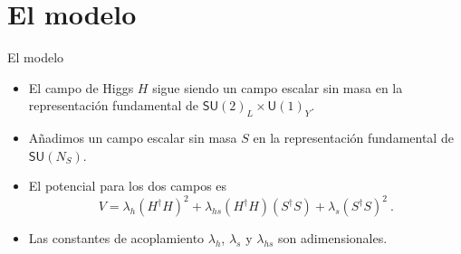 \documentclass{beamer}
\begin{document}
\section{El modelo}
\begin{frame}{El modelo}
\begin{itemize}
\item<only@1> El campo de Higgs $H$ sigue siendo un campo escalar sin masa en la representación fundamental de $\mathsf{SU}(2)_L\times \mathsf{U}(1)_Y$.
\item<only@1> Añadimos un campo escalar sin masa $S$ en la representación fundamental de $\mathsf{SU}(N_S)$.
\item<only@1> El potencial para los dos campos es
\begin{equation}\label{eq:CWpotential}
V = \lambda_h (H^\dagger H)^2 + \lambda_{hs} (H^\dagger H) (S^\dagger S) + \lambda_s (S^\dagger S)^2\ .
\end{equation}
\item<only@1> Las constantes de acoplamiento $\lambda_h$, $\lambda_s$ y $\lambda_{hs}$ son adimensionales.


\end{itemize}
\end{frame}
\end{document}
